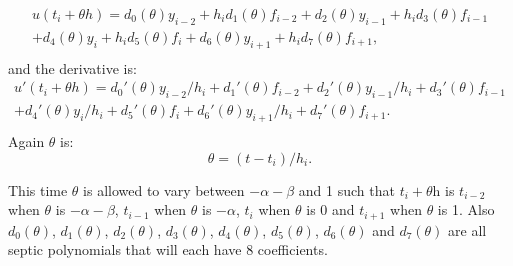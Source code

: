 \begin{equation}
\begin{split}
u(t_i + \theta h) = d_{0}(\theta)y_{i-2} +  h_id_{1}(\theta)f_{i-2} 
+ d_{2}(\theta)y_{i-1}     +  h_id_{3}(\theta)f_{i-1} \\
+ d_{4}(\theta)y_i     +  h_id_{5}(\theta)f_i 
+ d_{6}(\theta)y_{i + 1} + h_id_{7}(\theta)f_{i + 1}, \\
\end{split}
\end{equation}
and the derivative is:
\begin{equation}
\begin{split}
u'(t_i + \theta h) = d_{0}'(\theta)y_{i-2}/h_i +  d_{1}'(\theta)f_{i-2} 
+ d_{2}'(\theta)y_{i-1}/h_i   +  d_{3}'(\theta)f_{i-1} \\
+ d_{4}'(\theta)y_i/h_i       +  d_{5}'(\theta)f_i 
+ d_{6}'(\theta)y_{i + 1}/h_i +  d_{7}'(\theta)f_{i + 1}. \\
\end{split}
\end{equation}
Again $\theta$ is:
\begin{equation}
\theta = (t - t_i) / h_i.
\end{equation}

This time $\theta$ is allowed to vary between $-\alpha-\beta$ and 1 such that $t_i + \theta$h is $t_{i-2}$ when $\theta$ is $-\alpha-\beta$, $t_{i-1}$ when $\theta$ is $-\alpha$, $t_i$ when $\theta$ is 0 and $t_{i + 1}$ when $\theta$ is 1. Also $d_0(\theta)$, $d_1(\theta)$, $d_2(\theta)$, $d_3(\theta)$, $d_4(\theta)$, $d_5(\theta)$, $d_6(\theta)$ and $d_7(\theta)$ are all septic polynomials that will each have 8 coefficients.

